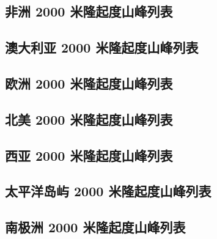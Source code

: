 \documentclass[10pt,twocolumn,letterpaper]{article}
\begin{document}
\subsection{非洲 2000 米隆起度山峰列表}

\subsection{澳大利亚 2000 米隆起度山峰列表}
\subsection{欧洲 2000 米隆起度山峰列表}

\subsection{北美 2000 米隆起度山峰列表}
\subsection{西亚 2000 米隆起度山峰列表}

\subsection{太平洋岛屿 2000 米隆起度山峰列表}

\subsection{南极洲 2000 米隆起度山峰列表}

\clearpage
\twocolumn

{\small


}
\end{document}
